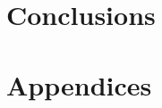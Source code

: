\documentclass[11pt,a4paper]{report}
\theoremstyle{definition}
\numberwithin{property}{chapter}
\numberwithin{definition}{chapter}
\numberwithin{lemma}{chapter}
\numberwithin{assumption}{chapter}
\numberwithin{corollary}{chapter}
\numberwithin{proposal}{chapter}
\numberwithin{failedattempt}{chapter}
\begin{document}





\part{Conclusions}




\part{Appendices}
\appendix






\end{document}
